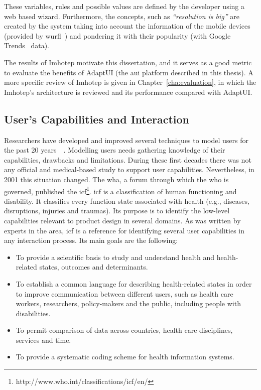 \inputminted[linenos=true, fontsize=\footnotesize, frame=lines]{java}{5_experiments_and_results/imhotep_pseudocode.txt}

These variables, rules and possible values are defined by the developer using a
web based wizard. Furthermore, the concepts, such as \textit{``resolution is 
big''} are created by the system taking into account the information of the mobile
devices (provided by \ac{wurfl}~\citep{wurfl}) and pondering it with their 
popularity (with Google Trends~\citep{trends} data).

The results of Imhotep motivate this dissertation, and it serves as a good metric
to evaluate the benefits of AdaptUI (the \ac{aui} platform described in this thesis). 
A more specific review of Imhotep is given in Chapter~\ref{cha:evaluation}, in 
which the Imhotep's architecture is reviewed and its performance compared with 
AdaptUI.


\subsection{User's Capabilities and Interaction}
\label{sec:background_icf}

Researchers have developed and improved several techniques to model users for 
the past 20 years~\citep{petrelli_user_centered_1999}~\citep{fink_adaptable_1997}. 
Modelling users needs gathering knowledge of their capabilities, drawbacks 
and limitations. During these first decades there was not any official and 
medical-based study to support user capabilities. Nevertheless, in 2001 
this situation changed. The \ac{wha}, a forum through which the \ac{who} is
governed, published the \ac{icf}\footnote{http://www.who.int/classifications/icf/en/}. 
\ac{icf} is a classification of human functioning and disability. It 
classifies every function state associated with health (e.g., diseases, 
disruptions, injuries and traumas). Its purpose is to identify the low-level 
capabilities relevant to product design in several domains. As was written by 
experts in the area, \ac{icf} is a reference for identifying several user 
capabilities in any interaction process. Its main goals are the following:

\begin{itemize}
  \item To provide a scientific basis to study and understand health and
  health-related states, outcomes and determinants.
  \item To establish a common language for describing health-related states in 
  order to improve communication between different users, such as health care 
  workers, researchers, policy-makers and the public, including people with 
  disabilities.
  \item To permit comparison of data across countries, health care disciplines,
  services and time.
  \item To provide a systematic coding scheme for health information systems.
\end{itemize}

